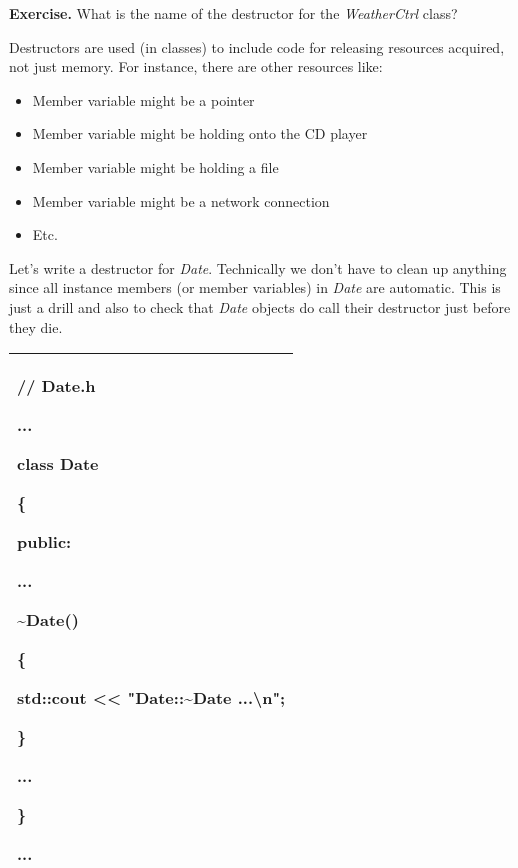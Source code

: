\documentclass[
]{article}
\providecommand{\tightlist}{%
  \setlength{\itemsep}{0pt}\setlength{\parskip}{0pt}}
\begin{document}
\textbf{Exercise.} What is the name of the destructor for the
\emph{WeatherCtrl} class?

Destructors are used (in classes) to include code for releasing
resources acquired, not just memory. For instance, there are other
resources like:

\begin{itemize}
\tightlist
\item
  Member variable might be a pointer
\item
  Member variable might be holding onto the CD player
\item
  Member variable might be holding a file
\item
  Member variable might be a network connection
\item
  Etc.
\end{itemize}

Let's write a destructor for \emph{Date}. Technically we don't have to
clean up anything since all instance members (or member variables) in
\emph{Date} are automatic. This is just a drill and also to check that
\emph{Date} objects do call their destructor just before they die.

\begin{longtable}[]{@{}l@{}}
\toprule
\endhead
\begin{minipage}[t]{0.97\columnwidth}\raggedright
// Date.h

...

class Date

\{

public:

...

\textbf{\textasciitilde Date()}

\{

std::cout \textless\textless{} "Date::\textasciitilde Date
...\textbackslash n";

\}

...

\}

...\strut
\end{minipage}\tabularnewline
\bottomrule
\end{longtable}
\end{document}
